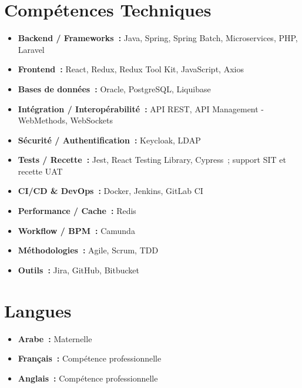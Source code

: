 \section*{Compétences Techniques}

\begin{itemize}
    \item \textbf{Backend / Frameworks~:} Java, Spring, Spring Batch, Microservices, PHP, Laravel
    \item \textbf{Frontend~:} React, Redux, Redux Tool Kit, JavaScript, Axios
    \item \textbf{Bases de données~:} Oracle, PostgreSQL, Liquibase
    \item \textbf{Intégration / Interopérabilité~:} API REST, API Management - WebMethods, WebSockets
    \item \textbf{Sécurité / Authentification~:} Keycloak, LDAP
    \item \textbf{Tests / Recette~:} Jest, React Testing Library, Cypress~; support SIT et recette UAT
    \item \textbf{CI/CD \& DevOps~:} Docker, Jenkins, GitLab CI
    \item \textbf{Performance / Cache~:} Redis
    \item \textbf{Workflow / BPM~:} Camunda
    \item \textbf{Méthodologies~:} Agile, Scrum, TDD
    \item \textbf{Outils~:} Jira, GitHub, Bitbucket
\end{itemize}

\section*{Langues}

\begin{itemize}
    \item \textbf{Arabe~:} Maternelle
    \item \textbf{Français~:} Compétence professionnelle
    \item \textbf{Anglais~:} Compétence professionnelle
\end{itemize}

